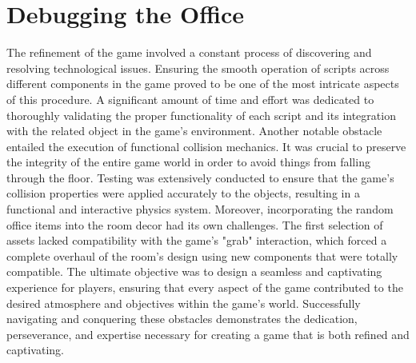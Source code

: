 \documentclass{vgtc}                          %
\begin{document}
\section{Debugging the Office}
The refinement of the game involved a constant process of discovering and resolving technological issues. Ensuring the smooth operation of scripts across different components in the game proved to be one of the most intricate aspects of this procedure. A significant amount of time and effort was dedicated to thoroughly validating the proper functionality of each script and its integration with the related object in the game's environment. Another notable obstacle entailed the execution of functional collision mechanics. It was crucial to preserve the integrity of the entire game world in order to avoid things from falling through the floor. Testing was extensively conducted to ensure that the game's collision properties were applied accurately to the objects, resulting in a functional and interactive physics system. Moreover, incorporating the random office items into the room decor had its own challenges. The first selection of assets lacked compatibility with the game's "grab" interaction, which forced a complete overhaul of the room's design using new components that were totally compatible. The ultimate objective was to design a seamless and captivating experience for players, ensuring that every aspect of the game contributed to the desired atmosphere and objectives within the game's world. Successfully navigating and conquering these obstacles demonstrates the dedication, perseverance, and expertise necessary for creating a game that is both refined and captivating. 
\end{document}

